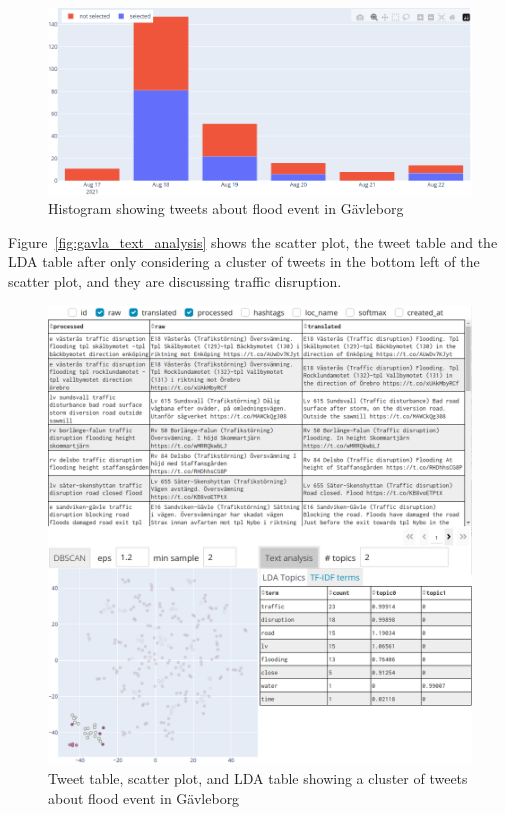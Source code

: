 \begin{figure}[H]
  \begin{center}
    \includegraphics[width=\columnwidth]{./images/gavle_histogram.png}
  \end{center}
  \caption{Histogram showing tweets about flood event in Gävleborg}
  \label{fig:gavle_histogram}
\end{figure}


Figure~\ref{fig:gavla_text_analysis} shows the scatter plot, the tweet table and the \ac{LDA} table after only considering a
cluster of tweets in the bottom left of the scatter plot, and they are discussing traffic
disruption.

\begin{figure}[H]
  \begin{center}
    \includegraphics[width=\columnwidth]{./images/gavle_text_analysis.png}
  \end{center}
  \caption{Tweet table, scatter plot, and \ac{LDA} table showing a cluster of tweets about flood event in Gävleborg}
  \label{fig:gavle_text_analysis}
\end{figure}


